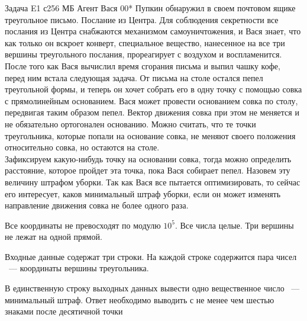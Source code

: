 \begin{problem}{Задача E}{1 с}{256 МБ}
Агент Вася 00* Пупкин  обнаружил в своем почтовом ящике треугольное
письмо. Послание из Центра. Для соблюдения секретности все послания из Центра
снабжаются механизмом самоуничтожения, и Вася знает, что как только он вскроет
конверт, специальное вещество, нанесенное на все три вершины треугольного
послания, прореагирует с воздухом и воспламенится.\\
После того как Вася вычислил время сгорания письма и выпил чашку кофе,
перед ним встала следующая задача. От письма на столе остался
пепел треугольной формы, и теперь он хочет собрать его в одну точку
с помощью совка с прямолинейным основанием. Вася может провести
основанием совка по столу, передвигая таким образом пепел.
Вектор движения совка при этом не меняется и не обязательно ортогонален
основанию. Можно считать, что те точки треугольника, которые попали на основание
совка, не меняют своего положения относительно совка, но остаются на столе.\\
Зафиксируем какую-нибудь точку на основании совка, тогда можно
определить расстояние, которое пройдет эта точка, пока Вася собирает пепел.
Назовем эту величину штрафом уборки.
Так как Вася все пытается оптимизировать, то сейчас его интересует, каков
минимальный штраф уборки, если он может изменять направление
движения совка не более одного раза.

\Limit

Все координаты не превосходят по модулю $10^5$.
Все числа целые.
Три вершины не лежат на одной прямой.

\InputFile
Входные данные содержат три строки. На каждой строке содержится пара чисел
~--- координаты вершины треугольника.

\OutputFile
В единственную строку выходных данных вывести одно вещественное число ~---
минимальный штраф. Ответ необходимо
выводить с не менее чем шестью знаками после десятичной точки

\Example
\begin{example}
\end{example}
\end{problem}
